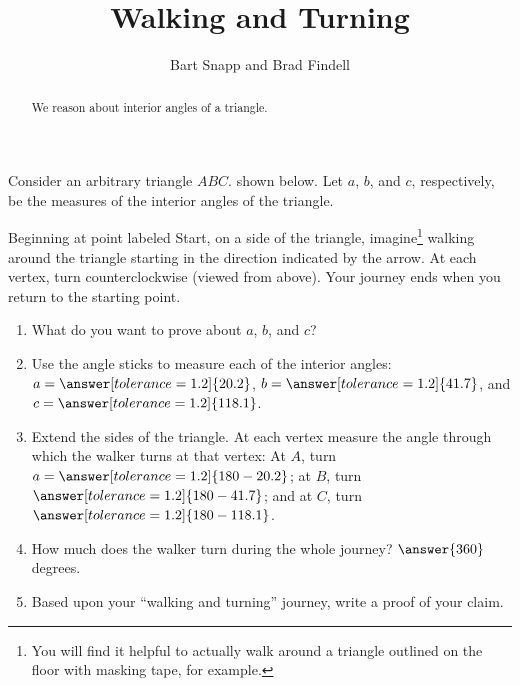 \documentclass[nooutcomes,noauthor]{ximera}
\title{Walking and Turning}
\author{Bart Snapp and Brad Findell}
\begin{document}
\begin{abstract}
  We reason about interior angles of a triangle.
\end{abstract}
\maketitle


\begin{problem}
Consider an arbitrary triangle $ABC$. shown below.  Let $a$, $b$, and $c$, respectively, be the measures of the interior angles of the triangle.  

\begin{center}  
\end{center}

Beginning at point labeled Start, on a side of the triangle, imagine\footnote{You will find it helpful to actually walk around a triangle outlined on the floor with masking tape, for example.} walking around the triangle starting in the direction indicated by the arrow.  At each vertex, turn counterclockwise (viewed from above).  Your journey ends when you return to the starting point.  
\begin{enumerate}
\item What do you want to prove about $a$, $b$, and $c$?  
\item Use the angle sticks to measure each of the interior angles: $a=\answer[tolerance=1.2]{20.2}$, $b=\answer[tolerance=1.2]{41.7}$, and $c=\answer[tolerance=1.2]{118.1}$.
\item Extend the sides of the triangle.  At each vertex measure the angle through which the walker turns at that vertex:  
At $A$, turn $a=\answer[tolerance=1.2]{180-20.2}$; at $B$, turn $\answer[tolerance=1.2]{180-41.7}$; and at $C$, turn $\answer[tolerance=1.2]{180-118.1}$.
\item How much does the walker turn during the whole journey?  $\answer{360}$ degrees.
\item Based upon your ``walking and turning'' journey, write a proof of your claim.  

\end{enumerate}
\end{problem}
\end{document}
